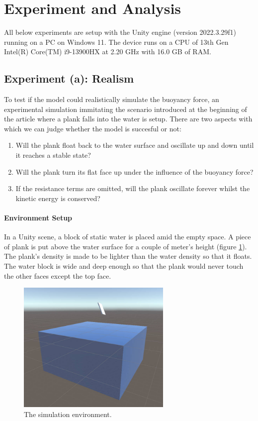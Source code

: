 \section{Experiment and Analysis}

All below experiments are setup with the Unity engine (version 2022.3.29f1) running on a PC on Windows 11.
The device runs on a CPU of 13th Gen Intel(R) Core(TM) i9-13900HX at 2.20 GHz with 16.0 GB of RAM.

\subsection{Experiment (a): Realism}

To test if the model could realistically simulate the buoyancy force, an experimental simulation immitating the scenario introduced at the beginning of the article where a plank falls into the water is setup.
There are two aspects with which we can judge whether the model is succesful or not:
\begin{enumerate}
	\item Will the plank float back to the water surface and oscillate up and down until it reaches a stable state?
	\item Will the plank turn its flat face up under the influence of the buoyancy force?
	\item If the resistance terms are omitted, will the plank oscillate forever whilst the kinetic energy is conserved?
\end{enumerate}

\paragraph{Environment Setup}

In a Unity scene, a block of static water is placed amid the empty space.
A piece of plank is put above the water surface for a couple of meter's height (figure \ref{simulation-environment}).
The plank's density is made to be lighter than the water density so that it floats.
The water block is wide and deep enough so that the plank would never touch the other faces except the top face.

\begin{figure}[h]
	\centering
	\includegraphics[height=2.5in]{figures/experiment-environment.jpg}
	\caption{The simulation environment.}
	\label{simulation-environment}
\end{figure}

